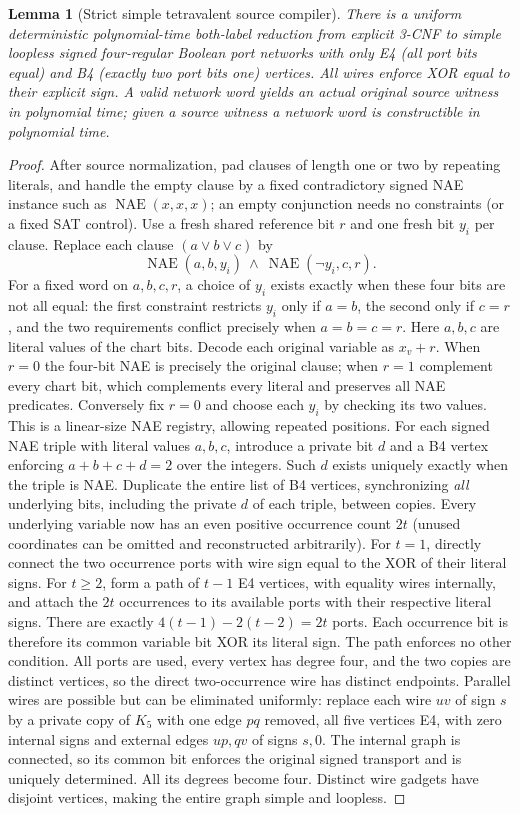 \documentclass[11pt]{article}
\newtheorem{lemma}[theorem]{Lemma}
\begin{document}
\begin{lemma}[Strict simple tetravalent source compiler]\label{lem:i21-source}
There is a uniform deterministic polynomial-time both-label reduction from explicit 3-CNF to simple loopless signed four-regular Boolean port networks with only E4 (all port bits equal) and B4 (exactly two port bits one) vertices. All wires enforce XOR equal to their explicit sign. A valid network word yields an actual original source witness in polynomial time; given a source witness a network word is constructible in polynomial time.
\end{lemma}
\begin{proof}
After source normalization, pad clauses of length one or two by repeating literals, and handle the empty clause by a fixed contradictory signed NAE instance such as $\operatorname{NAE}(x,x,x)$; an empty conjunction needs no constraints (or a fixed SAT control). Use a fresh shared reference bit $r$ and one fresh bit $y_i$ per clause. Replace each clause $(a\lor b\lor c)$ by
\[
 \operatorname{NAE}(a,b,y_i)\ \land\
 \operatorname{NAE}(\neg y_i,c,r).
\]
For a fixed word on $a,b,c,r$, a choice of $y_i$ exists exactly when these four bits are not all equal: the first constraint restricts $y_i$ only if $a=b$, the second only if $c=r$, and the two requirements conflict precisely when $a=b=c=r$. Here $a,b,c$ are literal values of the chart bits. Decode each original variable as $x_v+r$. When $r=0$ the four-bit NAE is precisely the original clause; when $r=1$ complement every chart bit, which complements every literal and preserves all NAE predicates. Conversely fix $r=0$ and choose each $y_i$ by checking its two values. This is a linear-size NAE registry, allowing repeated positions.
For each signed NAE triple with literal values $a,b,c$, introduce a private bit $d$ and a B4 vertex enforcing $a+b+c+d=2$ over the integers. Such $d$ exists uniquely exactly when the triple is NAE. Duplicate the entire list of B4 vertices, synchronizing \emph{all} underlying bits, including the private $d$ of each triple, between copies. Every underlying variable now has an even positive occurrence count $2t$ (unused coordinates can be omitted and reconstructed arbitrarily). For $t=1$, directly connect the two occurrence ports with wire sign equal to the XOR of their literal signs. For $t\ge2$, form a path of $t-1$ E4 vertices, with equality wires internally, and attach the $2t$ occurrences to its available ports with their respective literal signs. There are exactly $4(t-1)-2(t-2)=2t$ ports. Each occurrence bit is therefore its common variable bit XOR its literal sign. The path enforces no other condition. All ports are used, every vertex has degree four, and the two copies are distinct vertices, so the direct two-occurrence wire has distinct endpoints. Parallel wires are possible but can be eliminated uniformly: replace each wire $uv$ of sign $s$ by a private copy of $K_5$ with one edge $pq$ removed, all five vertices E4, with zero internal signs and external edges $up,qv$ of signs $s,0$. The internal graph is connected, so its common bit enforces the original signed transport and is uniquely determined. All its degrees become four. Distinct wire gadgets have disjoint vertices, making the entire graph simple and loopless.

\end{proof}
\end{document}
